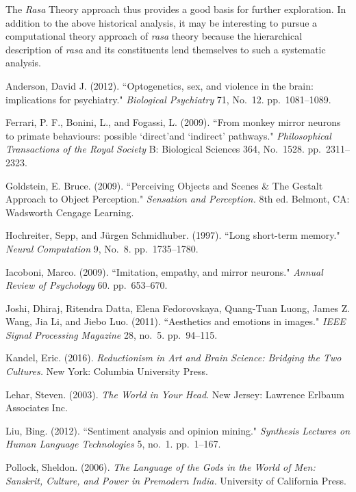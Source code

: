 The \textsl{Rasa} Theory approach thus provides a good basis for further exploration. In addition to the above historical analysis, it may be interesting to pursue a computational theory approach of \textsl{rasa} theory because the hierarchical description of \textsl{rasa} and its constituents lend themselves to such a systematic analysis.

\begin{thebibliography}{99}
\itemsep=2pt
Anderson, David J. (2012). ``Optogenetics, sex, and violence in the brain: implications for psychiatry." \textsl{Biological Psychiatry} 71, No.~12. pp.~1081--1089.

Ferrari, P. F., Bonini, L., and Fogassi, L. (2009). ``From monkey mirror neurons to primate behaviours: possible ‘direct’and ‘indirect’ pathways." \textsl{Philosophical Transactions of the Royal Society} B: Biological Sciences 364, No.~1528. pp.~2311--2323.

Goldstein, E. Bruce. (2009). ``Perceiving Objects and Scenes \& The Gestalt Approach to Object Perception." \textsl{Sensation and Perception.} 8th ed. Belmont, CA: Wadsworth Cengage Learning.

Hochreiter, Sepp, and Jürgen Schmidhuber. (1997). ``Long short-term memory." \textsl{Neural} \textsl{Computation} 9, No.~8. pp.~1735--1780.

Iacoboni, Marco. (2009). ``Imitation, empathy, and mirror neurons." \textsl{Annual Review of Psychology} 60. pp.~653--670.

Joshi, Dhiraj, Ritendra Datta, Elena Fedorovskaya, Quang-Tuan Luong, James Z. Wang, Jia Li, and Jiebo Luo. (2011). ``Aesthetics and emotions in images." \textsl{IEEE Signal Processing Magazine} 28, no.~5. pp.~94--115.

Kandel, Eric. (2016). \textsl{Reductionism in Art and Brain Science: Bridging the Two Cultures.} New York: Columbia University Press.

Lehar, Steven. (2003). \textsl{The World in Your Head}. New Jersey: Lawrence Erlbaum Associates Inc.

Liu, Bing. (2012). ``Sentiment analysis and opinion mining." \textsl{Synthesis Lectures on Human Language Technologies} 5, no.~1. pp.~1--167.

Pollock, Sheldon. (2006). \textsl{The Language of the Gods in the World of Men: Sanskrit, Culture, and Power in Premodern India.} University of California Press.


\end{thebibliography}
